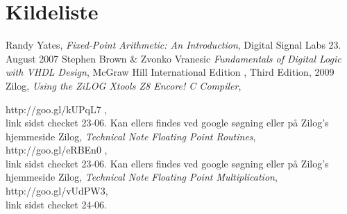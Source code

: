 \section{Kildeliste}
\begin{thebibliography}{9}

   Randy Yates,
  \emph{Fixed-Point Arithmetic: An Introduction},
   Digital Signal Labs
  23. August
  2007
	Stephen Brown \& Zvonko Vranesic
	\emph{Fundamentals of Digital Logic with VHDL Design},
	McGraw Hill International Edition , Third Edition,
	2009
	Zilog,
 \emph{Using the ZiLOG Xtools Z8 Encore! C Compiler},

	http://goo.gl/kUPqL7 , \\ 
	link sidst checket 23-06. Kan ellers findes ved google søgning eller på Zilog's hjemmeside
	Zilog,
	\emph{Technical Note 
Floating Point Routines}, \\
	http://goo.gl/eRBEn0 , \\
	link sidst checket 23-06. Kan ellers findes ved google søgning eller på Zilog's hjemmeside
Zilog,
\emph{Technical Note
Floating Point Multiplication}, \\
http://goo.gl/vUdPW3, \\
link sidst checket 24-06.
\end{thebibliography}